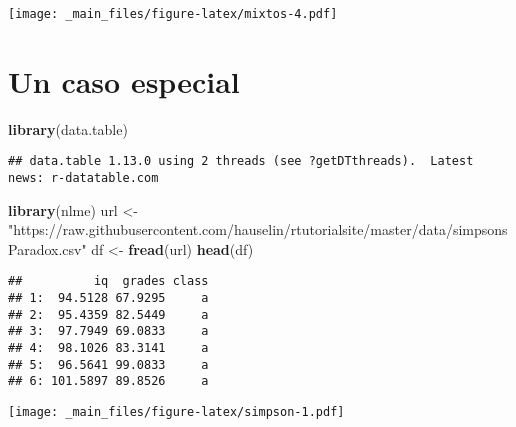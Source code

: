\documentclass[
]{book}
\newenvironment{Shaded}{\begin{snugshade}}{\end{snugshade}}
\newcommand{\KeywordTok}[1]{\textcolor[rgb]{0.13,0.29,0.53}{\textbf{#1}}}
\newcommand{\NormalTok}[1]{#1}
\newcommand{\OperatorTok}[1]{\textcolor[rgb]{0.81,0.36,0.00}{\textbf{#1}}}
\newcommand{\StringTok}[1]{\textcolor[rgb]{0.31,0.60,0.02}{#1}}
\begin{document}
\texttt{[image: \_main\_files/figure-latex/mixtos-4.pdf]}

\hypertarget{un-caso-especial}{%
\section{Un caso especial}\label{un-caso-especial}}

\begin{Shaded}
\begin{Highlighting}[]
\KeywordTok{library}\NormalTok{(data.table)}
\end{Highlighting}
\end{Shaded}

\begin{verbatim}
## data.table 1.13.0 using 2 threads (see ?getDTthreads).  Latest news: r-datatable.com
\end{verbatim}

\begin{Shaded}
\begin{Highlighting}[]
\KeywordTok{library}\NormalTok{(nlme)}
\NormalTok{url <-}\StringTok{ "https://raw.githubusercontent.com/hauselin/rtutorialsite/master/data/simpsonsParadox.csv"}
\NormalTok{df <-}\StringTok{ }\KeywordTok{fread}\NormalTok{(url)}
\KeywordTok{head}\NormalTok{(df)}
\end{Highlighting}
\end{Shaded}

\begin{verbatim}
##          iq  grades class
## 1:  94.5128 67.9295     a
## 2:  95.4359 82.5449     a
## 3:  97.7949 69.0833     a
## 4:  98.1026 83.3141     a
## 5:  96.5641 99.0833     a
## 6: 101.5897 89.8526     a
\end{verbatim}

\begin{Shaded}
\end{Shaded}

\texttt{[image: \_main\_files/figure-latex/simpson-1.pdf]}
\end{document}
